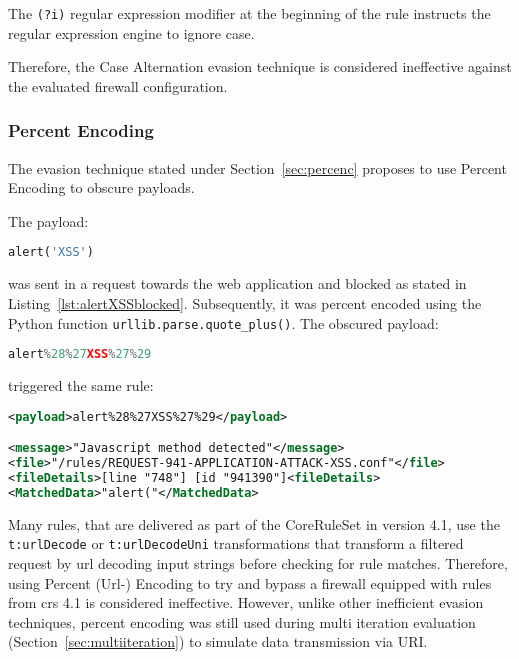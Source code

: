 The \verb|(?i)| regular expression modifier at the beginning of the rule instructs the regular expression engine to ignore case. \cite{regex/jan}

Therefore, the Case Alternation evasion technique is considered ineffective against the evaluated firewall configuration.


\subsubsection{Percent Encoding}
\label{sec:percencsingleiter}
The evasion technique stated under Section~\ref{sec:percenc} proposes to use Percent Encoding to obscure payloads.

The payload:

\begin{lstlisting}[style=basicStyle, language=Python]
alert('XSS')
\end{lstlisting}

was sent in a request towards the web application and blocked as stated in Listing~\ref{lst:alertXSSblocked}. Subsequently, it was percent encoded using the Python function \verb|urllib.parse.quote_plus()|. The obscured payload:

\begin{lstlisting}[style=basicStyle, language=Python]
alert%28%27XSS%27%29
\end{lstlisting}

triggered the same rule:

\begin{lstlisting}[style=ruleStyle, language=XML, caption=Percent encoded alert('XSS') blocked, label={lst:urlencodedexampleblocked}]
<payload>alert%28%27XSS%27%29</payload>

<message>"Javascript method detected"</message>
<file>"/rules/REQUEST-941-APPLICATION-ATTACK-XSS.conf"</file>
<fileDetails>[line "748"] [id "941390"]<fileDetails>
<MatchedData>"alert("</MatchedData>
\end{lstlisting}

Many rules, that are delivered as part of the CoreRuleSet in version 4.1, use the \verb|t:urlDecode| or \verb|t:urlDecodeUni| transformations that transform a filtered request by url decoding input strings before checking for rule matches. Therefore, using Percent (Url-) Encoding to try and bypass a firewall equipped with rules from \acrshort{crs} 4.1 is considered ineffective. However, unlike other inefficient evasion techniques, percent encoding was still used during multi iteration evaluation (Section~\ref{sec:multiiteration}) to simulate data transmission via URI.  

